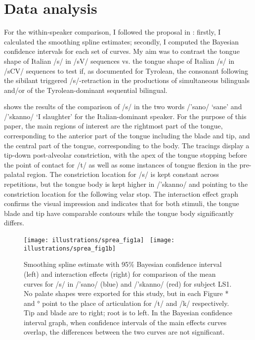\documentclass[output=paper]{LSP/langsci}
\begin{document}
\section{Data analysis}
For the within-speaker comparison, I followed the proposal in \citet{davidson_comparing_2006}: firstly, I calculated the smoothing spline estimates; secondly, I computed the Bayesian confidence intervals for each set of curves. My aim was to contrast the tongue shape of Italian /s/ in /sV/ sequences vs. the tongue shape of Italian /s/ in /sCV/ sequences to test if, as documented for Tyrolean, the consonant following the sibilant triggered /s/-retraction in the productions of simultaneous bilinguals and/or of the Tyrolean-dominant sequential bilingual.

 shows the results of the comparison of /s/ in the two words /'sano/ `sane' and /'skanno/ `I slaughter' for the Italian-dominant speaker. For the purpose of this paper, the main regions of interest are the rightmost part of the tongue, corresponding to the anterior part of the tongue including the blade and tip, and the central part of the tongue, corresponding to the body. The tracings display a tip-down post-alveolar constriction, with the apex of the tongue stopping before the point of contact for /t/ as well as some instances of tongue flexion in the pre-palatal region. The constriction location for /s/ is kept constant across repetitions, but the tongue body is kept higher in /'skanno/ and pointing to the constriction location for the following velar stop. The interaction effect graph confirms the visual impression and indicates that for both stimuli, the tongue blade and tip have comparable contours while the tongue body significantly differs.

\begin{figure}  
\texttt{[image: illustrations/sprea\_fig1a]}~
\texttt{[image: illustrations/sprea\_fig1b]}
\label{fig:1}   
\caption{Smoothing spline estimate with 95\% Bayesian confidence interval (left) and interaction effects (right) for comparison of the mean curves for /s/ in /'sano/ (blue) and /'skanno/ (red) for subject LS1. No palate shapes were exported for this study, but in each Figure * and ° point to the place of articulation for /t/ and /k/ respectively. Tip and blade are to right; root is to left. In the Bayesian confidence interval graph, when confidence intervals of the main effects curves overlap, the differences between the two curves are not significant.}
\end{figure}
\end{document}
